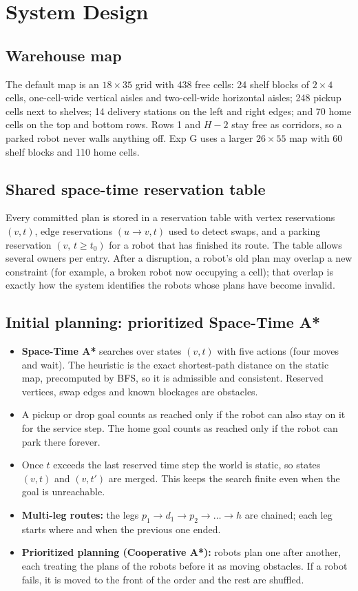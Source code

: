 \documentclass[11pt,a4paper]{article}
\begin{document}
\section{System Design}

\subsection{Warehouse map}
The default map is an $18\times35$ grid with 438 free cells: 24 shelf blocks of $2\times4$ cells,
one-cell-wide vertical aisles and two-cell-wide horizontal aisles; 248 pickup cells next to shelves;
14 delivery stations on the left and right edges; and 70 home cells on the top and bottom rows. Rows 1
and $H{-}2$ stay free as corridors, so a parked robot never walls anything off. Exp G uses a larger
$26\times55$ map with 60 shelf blocks and 110 home cells.

\subsection{Shared space-time reservation table}
Every committed plan is stored in a reservation table with
vertex reservations $(v,t)$, edge reservations $(u\!\to\!v,t)$ used to detect swaps, and a parking
reservation $(v,\,t\ge t_0)$ for a robot that has finished its route. The table allows several owners
per entry. After a disruption, a robot's old plan may overlap a new constraint (for example, a broken
robot now occupying a cell); that overlap is exactly how the system identifies the robots whose plans
have become invalid.

\subsection{Initial planning: prioritized Space-Time A*}
\begin{itemize}
  \item \textbf{Space-Time A*} searches over states $(v,t)$ with five actions (four moves and wait).
  The heuristic is the exact shortest-path distance on the static map, precomputed by BFS, so it is
  admissible and consistent. Reserved vertices, swap edges and known blockages are obstacles.
  \item A pickup or drop goal counts as reached only if the robot can also stay on it for the service
  step. The home goal counts as reached only if the robot can park there forever.
  \item Once $t$ exceeds the last reserved time step the world is static, so states $(v,t)$ and
  $(v,t')$ are merged. This keeps the search finite even when the goal is unreachable.
  \item \textbf{Multi-leg routes:} the legs $p_1\to d_1\to p_2\to\dots\to h$ are chained; each leg starts
  where and when the previous one ended.
  \item \textbf{Prioritized planning (Cooperative A*):} robots plan one after another, each treating the
  plans of the robots before it as moving obstacles. If a robot fails, it is moved to the front of the
  order and the rest are shuffled.
\end{itemize}
\end{document}
